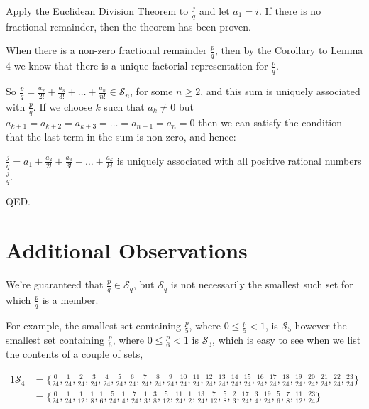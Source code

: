 \documentclass{article}
\begin{document}
Apply the Euclidean Division Theorem to \(\frac{j}{q}\) and let \(a_1 = i\). If there is no fractional remainder, then
the theorem has been proven.

When there is a non-zero fractional remainder \(\frac{p}{q}\), then 
by the Corollary to Lemma 4 we know that there is a
unique factorial-representation for \(\frac{p}{q}\).

So \(\frac{p}{q} = \frac{a_2}{2!} + \frac{a_3}{3!} + \dots{} + \frac{a_n}{n!} \in \mathcal{S}_n\), for some
\(n \ge{} 2\), and this sum is uniquely associated with \(\frac{p}{q}\).
If we choose \(k\) such that \(a_k \ne{} 0 \) but \(a_{k+1} =
a_{k+2} =
a_{k+3} =
\dots{} =
a_{n-1} =
a_{n} = 0\) then we can satisfy the condition that the last term in the sum is non-zero, and hence:

\(\frac{j}{q} = a_1 + \frac{a_2}{2!} + \frac{a_3}{3!} + \dots{} + \frac{a_k}{k!}\)
is uniquely associated with all positive rational numbers \(\frac{j}{q}\).

QED.

\break
\section*{Additional Observations}

We're guaranteed that \(\frac{p}{q} \in{} \mathcal{S}_q\), but \(\mathcal{S}_q\) is not necessarily 
the smallest such set for which \(\frac{p}{q}\) is a member.

For example,
the smallest set containing \(\frac{p}{5}\), where \(0 \le{} \frac{p}{5} < 1\), is \(\mathcal{S}_5\)
however
the smallest set containing \(\frac{p}{6}\), where \(0 \le{} \frac{p}{6} < 1\) is \(\mathcal{S}_3\),
which is easy to see when we list the contents of a couple of sets,

{\footnotesize
\bgroup                                  %
\setlength{\abovedisplayskip}{0pt}
\begin{alignat*}{1}
\mathcal{S}_4 &= \{
\frac{ 0}{24},
\frac{ 1}{24},
\frac{ 2}{24},
\frac{ 3}{24},
\frac{ 4}{24},
\frac{ 5}{24},
\frac{ 6}{24},
\frac{ 7}{24},
\frac{ 8}{24},
\frac{ 9}{24},
\frac{10}{24},
\frac{11}{24},
\frac{12}{24},
\frac{13}{24},
\frac{14}{24},
\frac{15}{24},
\frac{16}{24},
\frac{17}{24},
\frac{18}{24},
\frac{19}{24},
\frac{20}{24},
\frac{21}{24},
\frac{22}{24},
\frac{23}{24}
\} \\
&= \{
\frac{ 0}{24},
\frac{ 1}{24},
\frac{ 1}{12},
\frac{ 1}{ 8},
\frac{ 1}{ 6},
\frac{ 5}{24},
\frac{ 1}{ 4},
\frac{ 7}{24},
\frac{ 1}{ 3},
\frac{ 3}{ 8},
\frac{ 5}{12},
\frac{11}{24},
\frac{ 1}{ 2},
\frac{13}{24},
\frac{ 7}{12},
\frac{ 5}{ 8},
\frac{ 2}{ 3},
\frac{17}{24},
\frac{ 3}{ 4},
\frac{19}{24},
\frac{ 5}{ 6},
\frac{ 7}{ 8},
\frac{11}{12},
\frac{23}{24}
\}
\end{alignat*}
\egroup
}
\end{document}

